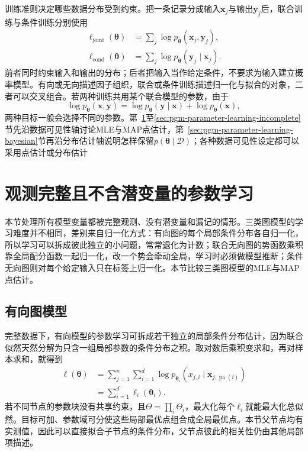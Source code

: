 训练准则决定哪些数据分布受到约束。把一条记录分成输入$\bm{x}_j$与输出$\bm{y}_j$后，联合训练与条件训练分别使用
\[
  \begin{aligned}
    \ell_{\mathrm{joint}}(\bm{\theta})
      &=\sum_j\log p_{\bm{\theta}}(\bm{x}_j,\bm{y}_j),\\
    \ell_{\mathrm{cond}}(\bm{\theta})
      &=\sum_j\log p_{\bm{\theta}}(\bm{y}_j\mid\bm{x}_j).
  \end{aligned}
\]
前者同时约束输入和输出的分布；后者把输入当作给定条件，不要求为输入建立概率模型。有向或无向描述因子组织，联合或条件训练描述归一化与拟合的对象，二者可以交叉组合。若两种训练共用某个联合模型的参数，由于
\[
  \log p_{\bm{\theta}}(\bm{x},\bm{y})
  =\log p_{\bm{\theta}}(\bm{y}\mid\bm{x})
   +\log p_{\bm{\theta}}(\bm{x}),
\]
两种目标一般会选择不同的参数。第~\ref{sec:pgm-parameter-learning-complete}至\ref{sec:pgm-parameter-learning-incomplete}节先沿数据可见性轴讨论MLE与MAP点估计，第~\ref{sec:pgm-parameter-learning-bayesian}节再沿分布估计轴说明怎样保留$p(\bm{\theta}\mid\mathcal{D})$；各种数据可见性设定都可以采用点估计或分布估计

\section{观测完整且不含潜变量的参数学习}
\label{sec:pgm-parameter-learning-complete}

本节处理所有模型变量都被完整观测、没有潜变量和漏记的情形。三类图模型的学习难度并不相同，差别来自归一化方式：有向图的每个局部条件分布各自归一化，所以学习可以拆成彼此独立的小问题，常常退化为计数；联合无向图的势函数乘积靠全局配分函数一起归一化，改一个势会牵动全局，学习时必须做模型推断；条件无向图则对每个给定输入只在标签上归一化。本节比较三类图模型的MLE与MAP点估计。

\subsection{有向图模型}
\label{sec:pgm-parameter-learning-directed}

完整数据下，有向模型的参数学习可拆成若干独立的局部条件分布估计，因为联合似然天然分解为只含一组局部参数的条件分布之积。取对数后乘积变求和，再对样本求和，就得到
\begin{equation}
  \begin{aligned}
    \ell(\bm{\theta})
      &=\sum_{j=1}^n\sum_{i=1}^d
        \log p_{\bm{\theta}_i}
        (x_{j,i}\mid\bm{x}_{j,\operatorname{pa}(i)})\\
      &=\sum_{i=1}^d\ell_i(\bm{\theta}_i).
  \end{aligned}
  \label{eq:pgm-parameter-learning-dag-likelihood}
\end{equation}
若不同节点的参数块没有共享约束，且$\Theta=\prod_i\Theta_i$，最大化每个$\ell_i$就能最大化总似然。目标可加、参数域可分使这些局部最优点组合成全局最优点。本节父节点均有实测值，因此可以直接拟合子节点的条件分布，父节点彼此的相关性仍由其他局部项描述。

